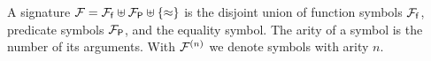 
\begin{definition}\label{def:signature}
A 
{\myem signature} 
${\mathcal F}= {{\mathcal F}_{\mathsf f}} 
\uplus {{\mathcal F}_{\mathsf P}} 
\uplus \{ \approx \}$
is the disjoint union of 
{\myem function symbols} ${{\mathcal F}_{\mathsf f}}$, 
{\myem predicate symbols} ${{\mathcal F}_{\mathsf P}}$,
and the equality symbol.
%
The {\myem arity} of a symbol is the number of its arguments.
With ${\mathcal F^{(n)}}$ we denote symbols with arity $n$.
\end{definition}


